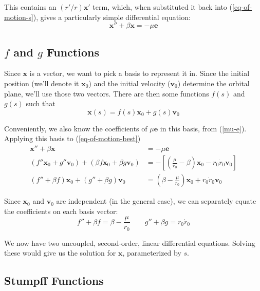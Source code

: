\documentclass{article}
\numberwithin{equation}{subsection}
\begin{document}
This contains an $(r'/r) \bm x'$ term, which, when substituted it back into (\ref{eq-of-motion-s}), gives a particularly simple differential equation:
\begin{equation}
\label{eq-of-motion-best}
\bm x'' + \beta \bm x = -\mu \bm e
\end{equation}

\subsection{$f$ and $g$ Functions}

Since $\bm x$ is a vector, we want to pick a basis to represent it in. Since the initial position (we'll denote it $\bm x_0$) and the initial velocity ($\bm v_0$) determine the orbital plane, we'll use those two vectors. There are then some functions $f(s)$ and $g(s)$ such that
\begin{equation}
\bm x(s) = f(s) \bm x_0 + g(s) \bm v_0
\end{equation}

Conveniently, we also know the coefficients of $\mu \bm e$ in this basis, from (\ref{mu-e}). Applying this basis to (\ref{eq-of-motion-best})
\begin{align*}
\bm x'' + \beta \bm x &= -\mu \bm e \\
(f'' \bm x_0 + g'' \bm v_0) + (\beta f \bm x_0 + \beta g \bm v_0) &= -\left[ \left( \frac{\mu}{r_0} - \beta \right) \bm x_0 - r_0 \dot{r}_0 \bm v_0 \right] \\
(f'' + \beta f) \bm x_0 + (g'' + \beta g) \bm v_0 &= \left( \beta - \frac{\mu}{r_0} \right) \bm x_0 + r_0 \dot{r}_0 \bm v_0
\end{align*}

Since $\bm x_0$ and $\bm v_0$ are independent (in the general case), we can separately equate the coefficients on each basis vector:
\begin{equation}
\label{f-and-g-equations}
f'' + \beta f = \beta - \frac{\mu}{r_0}  \qquad  g'' + \beta g = r_0 \dot{r}_0
\end{equation}

We now have two uncoupled, second-order, linear differential equations. Solving these would give us the solution for $\bm x$, parameterized by $s$.

\subsection{Stumpff Functions}
\end{document}

